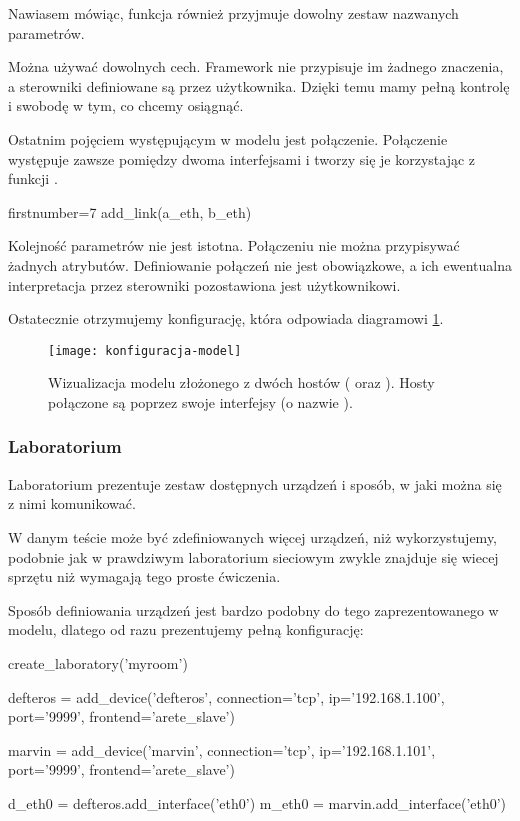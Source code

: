 \documentclass[00-praca-magisterska.tex]{subfiles}
\begin{document}
Nawiasem mówiąc, funkcja  również przyjmuje dowolny zestaw
nazwanych parametrów.

Można używać dowolnych cech. Framework nie przypisuje im żadnego znaczenia, a
sterowniki definiowane są przez użytkownika. Dzięki temu mamy pełną kontrolę i
swobodę w tym, co chcemy osiągnąć.

Ostatnim pojęciem występującym w modelu jest połączenie. Połączenie występuje
zawsze pomiędzy dwoma interfejsami i tworzy się je korzystając z funkcji
.

\begin{pythoncode*}{firstnumber=7}
  add_link(a_eth, b_eth)
\end{pythoncode*}

Kolejność parametrów nie jest istotna. Połączeniu nie można przypisywać żadnych
atrybutów. Definiowanie połączeń nie jest obowiązkowe, a ich ewentualna
interpretacja przez sterowniki pozostawiona jest użytkownikowi. 

Ostatecznie otrzymujemy konfigurację, która odpowiada diagramowi \ref{fig:konfiguracja-model}.

\begin{figure}[htb]
\begin{center}
\leavevmode
\texttt{[image: konfiguracja-model]}
\end{center}
\caption{Wizualizacja modelu złożonego z dwóch hostów ( oraz
). Hosty połączone są poprzez swoje interfejsy (o nazwie ).}
\label{fig:konfiguracja-model}
\end{figure}

\label{arete-master-config-lab}
\subsubsection{Laboratorium}

Laboratorium prezentuje zestaw dostępnych urządzeń i sposób, w jaki można się
z nimi komunikować.

W danym teście może być zdefiniowanych więcej urządzeń, niż wykorzystujemy, podobnie
jak w prawdziwym laboratorium sieciowym zwykle znajduje się wiecej sprzętu niż
wymagają tego proste ćwiczenia.

Sposób definiowania urządzeń jest bardzo podobny do tego zaprezentowanego w
modelu, dlatego od razu prezentujemy pełną konfigurację:

\begin{pythoncode}
  create_laboratory('myroom')

  defteros = add_device('defteros',
      connection='tcp',
      ip='192.168.1.100',
      port='9999',
      frontend='arete_slave')

  marvin = add_device('marvin',
      connection='tcp',
      ip='192.168.1.101',
      port='9999',
      frontend='arete_slave')

  d_eth0 = defteros.add_interface('eth0')
  m_eth0 = marvin.add_interface('eth0')
\end{pythoncode}
\end{document}

